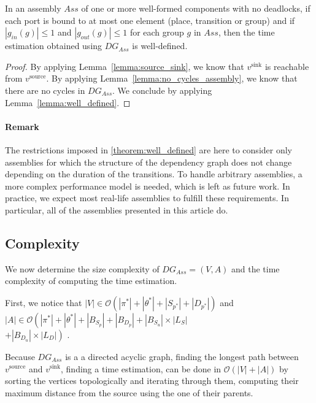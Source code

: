 \begin{theorem}
 In an assembly $Ass$ of one or more well-formed components with no deadlocks,
 if each port is bound to at most one element (place, transition or group) and if
 $\left|g_{in}(g)\right|\leq 1$ and $\left|g_{out}(g)\right|\leq 1$ for each group
 $g$ in $Ass$, then the time estimation obtained using $DG_{Ass}$ is well-defined.
 \label{theorem:well_defined}
\end{theorem}

\begin{proof}
 By applying Lemma~\ref{lemma:source_sink}, we know that $v^\text{sink}$ is reachable
 from $v^\text{source}$. By applying Lemma~\ref{lemma:no_cycles_assembly}, we know
 that there are no cycles in $DG_{Ass}$. We conclude by applying
 Lemma~\ref{lemma:well_defined}.
\end{proof}

\paragraph{Remark}

The restrictions imposed in \ref{theorem:well_defined} are here to consider only
assemblies for which the structure of the dependency graph does not change
depending on the duration of the transitions. To handle arbitrary assemblies,
a more complex performance model is needed, which is left as future work. In
practice, we expect most real-life assemblies to fulfill these requirements.
In particular, all of the assemblies presented in this article do.


\subsection{Complexity}

We now determine the size complexity of $DG_{Ass}=(V,A)$ and the time
complexity of computing the time estimation.

First, we notice that
$|V| \in \mathcal{O}\left(\left|\pi^*\right|+\left|\theta^*\right|+\left|S_{p^*}\right|+\left|D_{p^*}\right|\right)$
and
$|A| \in \mathcal{O}\left(\left|\pi^*\right|+\left|\theta^*\right|+\left|B_{S_p}\right|+\left|B_{D_p}\right|+\left|B_{S_u}\right|\times\left|L_S\right|\right.$ \\
$\left.+\left|B_{D_u}\right|\times\left|L_D\right|\right)$
.

Because $DG_{Ass}$ is a a directed acyclic graph, finding the longest path
between $v^\text{source}$ and $v^\text{sink}$, \ie finding a time estimation,
can be done in $\mathcal{O}(|V|+|A|)$ by sorting the
vertices topologically and iterating through them, computing their maximum
distance from the source using the one of their parents.

